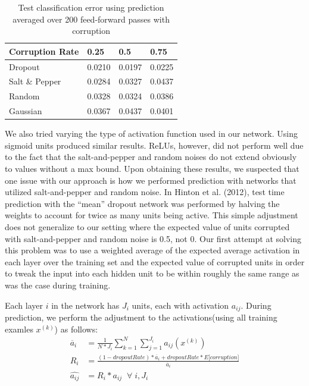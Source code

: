 \documentclass{article} %
\begin{document}
\begin{table}
\caption{Test classification error using prediction averaged over 200 feed-forward passes with corruption}
\label{tab:testErrorOrig}
\begin{center}
\begin{tabular}{| l |  l |  l  | l |}
\hline
Corruption Rate & 0.25 & 0.5 & 0.75 \\
\hline
\hline
Dropout & 0.0210 & 0.0197 & 0.0225 \\
\hline
Salt \& Pepper & 0.0284 & 0.0327 & 0.0437 \\
\hline
Random & 0.0328 & 0.0324 & 0.0386 \\
\hline
Gaussian & 0.0367 & 0.0437 & 0.0401 \\
\hline
\end{tabular}
\end{center}
\end{table}

We also tried varying the type of activation function used in our network. Using sigmoid units produced similar results. ReLUs, however, did not perform well due to the fact that the salt-and-pepper and random noises do not extend obviously to values without a max bound. Upon obtaining these results, we suspected that one issue with our approach is how we performed prediction with networks that utilized salt-and-pepper and random noise. In Hinton et al. (2012), test time prediction with the ``mean'' dropout network was performed by halving the weights to account for twice as many units being active. This simple adjustment does not generalize to our setting where the expected value of units corrupted with salt-and-pepper and random noise is 0.5, not 0. Our first attempt at solving this problem was to use a weighted average of the expected average activation in each layer over the training set and the expected value of corrupted units in order to tweak the input into each hidden unit to be within roughly the same range as was the case during training. 

Each layer $i$ in the network has $J_i$ units, each with activation $a_{ij}$. During prediction, we perform the adjustment to the activations(using all training examles $x^{(k)}$) as follows: 
\begin{align*}
  \overline{a}_i &= \frac{1}{N*J_i}\displaystyle\sum_{k=1}^{N}\displaystyle\sum_{j=1}^{J_i}a_{ij}(x^{(k)})\\
  R_i &= \frac{(1 - dropoutRate) * \overline{a}_i + dropoutRate * E\big[corruption\big]}{\overline{a}_i} \\
  \hat{a_{ij}} &= R_i * a_{ij} \;\; \forall \; i , J_i
\end{align*}
\end{document}
